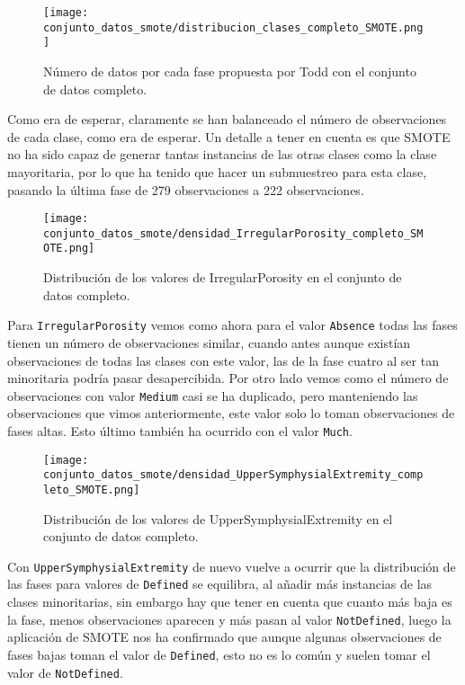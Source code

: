 \begin{figure}[H]
	\centering
	\texttt{[image: conjunto\_datos\_smote/distribucion\_clases\_completo\_SMOTE.png]}
	\caption{Número de datos por cada fase propuesta por Todd con el conjunto de datos completo.}
	\label{fig:conteo_c_smote}
\end{figure}

Como era de esperar, claramente se han balanceado el número de observaciones de cada clase, como era de esperar. Un detalle a tener en cuenta es que SMOTE no ha sido capaz de generar tantas instancias de las otras clases como la clase mayoritaria, por lo que ha tenido que hacer un submuestreo para esta clase, pasando la última fase de 279 observaciones a 222 observaciones.

\begin{figure}[H]
	\centering
	\texttt{[image: conjunto\_datos\_smote/densidad\_IrregularPorosity\_completo\_SMOTE.png]}
	\caption{Distribución de los valores de IrregularPorosity en el conjunto de datos completo.}
	\label{fig:densidad_IrregularPorosity_completo_smote}
\end{figure}

Para \texttt{IrregularPorosity} vemos como ahora para el valor \texttt{Absence} todas las fases tienen un número de observaciones similar, cuando antes aunque existían observaciones de todas las clases con este valor, las de la fase cuatro al ser tan minoritaria podría pasar desapercibida. Por otro lado vemos como el número de observaciones con valor \texttt{Medium} casi se ha duplicado, pero manteniendo las observaciones que vimos anteriormente, este valor solo lo toman observaciones de fases altas. Esto último también ha ocurrido con el valor \texttt{Much}.

\begin{figure}[H]
	\centering
	\texttt{[image: conjunto\_datos\_smote/densidad\_UpperSymphysialExtremity\_completo\_SMOTE.png]}
	\caption{Distribución de los valores de UpperSymphysialExtremity en el conjunto de datos completo.}
	\label{fig:densidad_UpperSymphysialExtremity_completo_smote}
\end{figure}

Con \texttt{UpperSymphysialExtremity} de nuevo vuelve a ocurrir que la distribución de las fases para valores de \texttt{Defined} se equilibra, al añadir más instancias de las clases minoritarias, sin embargo hay que tener en cuenta que cuanto más baja es la fase, menos observaciones aparecen y más pasan al valor \texttt{NotDefined}, luego la aplicación de SMOTE nos ha confirmado que aunque algunas observaciones de fases bajas toman el valor de \texttt{Defined}, esto no es lo común y suelen tomar el valor de \texttt{NotDefined}.

